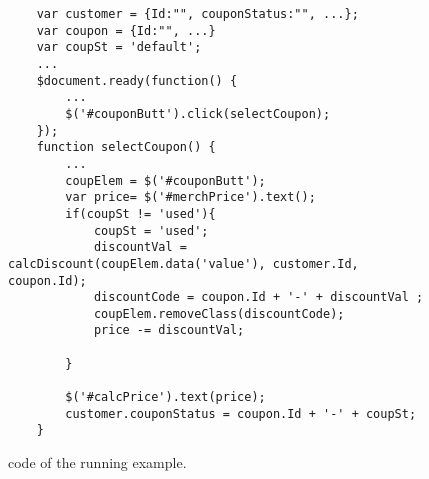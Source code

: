 \begin{figure}
\begin{lstlisting}
	var customer = {Id:"", couponStatus:"", ...};
	var coupon = {Id:"", ...}
	var coupSt = 'default';
	...
	$document.ready(function() {
		...
		$('#couponButt').click(selectCoupon);
	});
	function selectCoupon() {
		...
		coupElem = $('#couponButt');
		var price= $('#merchPrice').text();
		if(coupSt != 'used'){
			coupSt = 'used';
			discountVal = calcDiscount(coupElem.data('value'), customer.Id, coupon.Id);
			discountCode = coupon.Id + '-' + discountVal ;
			coupElem.removeClass(discountCode); 
			price -= discountVal;
			
		}
		
		$('#calcPrice').text(price);
		customer.couponStatus = coupon.Id + '-' + coupSt;  
	}

\end{lstlisting}
\vspace{-0.1in} 

\caption{\javascript code of the running example.}
\label{Fig:example}
\vspace{-0.2in} 

\end{figure}